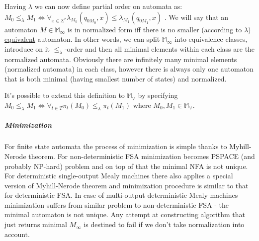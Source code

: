 \documentclass[12pt]{article}
\begin{document}
Having $\lambda$ we can now define partial order on automata as: \\ 
$M_0 \le_{\lambda} M_1 \iff \forall_{x\in\Sigma^*} \lambda_{M_0}(q_{0M_0},x) \le \lambda_{M_1}(q_{0M_1},x)$ . We will say that an automaton $M\in\mathbb{M}_\infty$ is in normalized form iff there is no smaller (according to $\lambda$) \underline{equivalent} automaton. In other words, we can split $\mathbb{ M}_\infty$ into equivalence classes, introduce on it $\le_\lambda$-order and then all minimal elements within each class are the normalized automata. Obviously there are infinitely many minimal elements (normalized automata) in each class, however there is always  only one automaton that is both minimal (having smallest number of states) and normalized.

It's possible to extend this definition to $\mathbb{ M}_\vee$ by specifying \\ $M_0 \le_{\lambda} M_1  \iff \forall_{t\in T} \pi_t(M_0) \le_{\lambda} \pi_t(M_1)$ where $M_0,M_1\in \mathbb{ M}_\vee$.



\subparagraph{Minimization} For finite state automata the process of minimization is simple thanks to Myhill-Nerode theorem. For non-deterministic FSA minimization becomes PSPACE (and probably NP-hard) problem and on top of that the minimal NFA is not unique. For deterministic single-output Mealy machines there also applies a special version of Myhill-Nerode theorem and minimization procedure is similar to that for deterministic FSA. In case of multi-output deterministic Mealy machines minimization suffers from similar problem to non-deterministic FSA - the minimal automaton is not unique. Any attempt at constructing algorithm that just returns minimal $M_\infty$ is destined to fail if we don't take normalization into account. 
\end{document}
